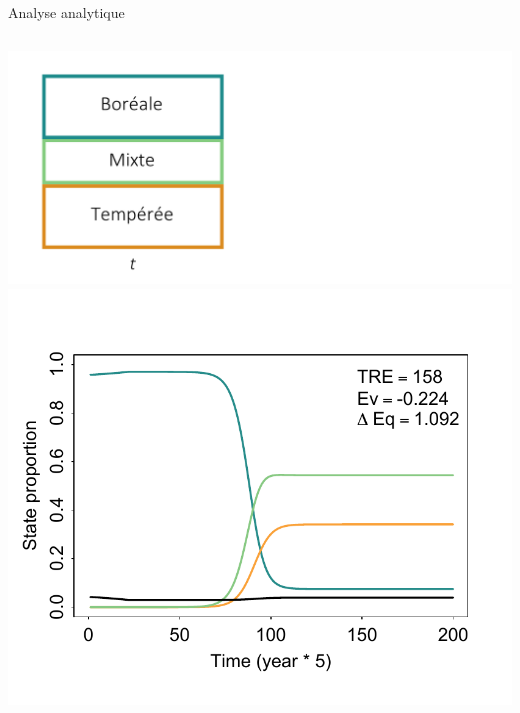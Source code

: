 \documentclass[11pt, compress, aspectratio=1610]{beamer}
\newcommand{\begincols}{\begin{columns}}
\newcommand{\stopcols}{\end{columns}}
\begin{document}
\begin{frame}{Analyse analytique}
\protect\hypertarget{analyse-analytique}{}

\begincols
{}

\includegraphics[scale=0.50]{figures/migration0.png}
\hfill{}
\includegraphics[scale=0.55]{figures/analyticalAnalysis} \stopcols

\end{frame}
\end{document}
